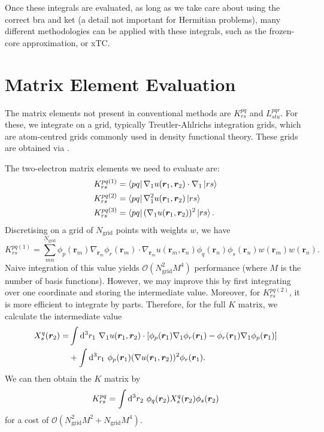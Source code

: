 Once these integrals are evaluated, as long as we take care about using the correct bra and ket (a detail not important for Hermitian problems), many different methodologies can be applied with these integrals, such as the frozen-core approximation, or \gls{xTC}.\supercite{christlmaierXTC2023}

\section{Matrix Element Evaluation}
The matrix elements not present in conventional methods are $K_{rs}^{pq}$ and $L_{stu}^{pqr}$. For these, we integrate on a grid, typically Treutler-Ahlrichs integration grids,
\supercite{beckeMulticenter1988,treutlerEfficient1995} which are atom-centred grids commonly used in density functional theory. These grids are obtained via \pyscf.

The two-electron matrix elements we need to evaluate are:
\begin{align}
    K_{rs}^{pq(1)} &= \bra{pq}\nabla_1u(\bm r_1, \bm r_2)\cdot\nabla_1\ket{rs}\\
    K_{rs}^{pq(2)} &= \bra{pq}\nabla_1^2u(\bm r_1, \bm r_2)\ket{rs}\\
    K_{rs}^{pq(3)} &= \bra{pq}(\nabla_1u(\bm r_1, \bm r_2))^2\ket{rs}.
\end{align}
Discretising on a grid of $N_\mathrm{grid}$ points with weights $w$, we have
\begin{equation}
    K_{rs}^{pq(1)} = \sum_{mn}^{N_\mathrm{grid}}
    \phi_p(\bm r_m)\nabla_{\bm r_m}\phi_r(\bm r_m)\cdot \nabla_{\bm r_m}u(\bm r_m, \bm r_n)\phi_q(\bm r_n)\phi_s(\bm r_n)w(\bm r_m)w(\bm r_n).
\end{equation}
Naive integration of this value yields $\mathcal{O}(N_\mathrm{grid}^2M^4)$ performance (where $M$ is the number of basis functions). However, we may improve this by first integrating over one coordinate and storing the intermediate value. Moreover, for $K_{rs}^{pq(2)}$, it is more efficient to integrate by parts. Therefore, for the full $K$ matrix, we calculate the intermediate value
\begin{align}
    X_s^q(\bm r_2) =& \int\mathrm{d}^3 r_1\ \nabla_1u(\bm r_1, \bm r_2)\cdot[\phi_p(\bm r_1) \nabla_1\phi_r(\bm r_1) - \phi_r(\bm r_1)
\nabla_1\phi_p(\bm r_1)]  \\
&+ \int\mathrm{d}^3 r_1\ \phi_p(\bm r_1)(\nabla u(\bm r_1, \bm r_2))^2 \phi_r(\bm r_1).
\end{align}
We can then obtain the $K$ matrix by
\begin{equation}
    K_{rs}^{pq} = \int\d^3 r_2\ \phi_q(\bm r_2)X_s^q(\bm r_2)\phi_s(\bm r_2)
\end{equation}
for a cost of $\mathcal{O}(N_\mathrm{grid}^2M^2+N_\mathrm{grid}M^4)$.

